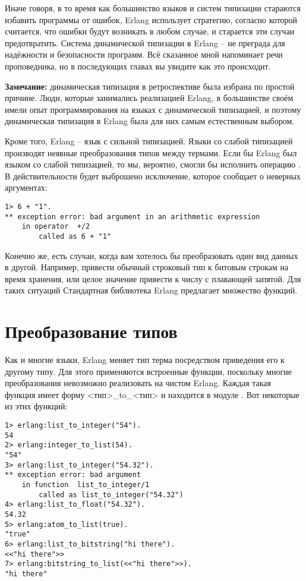 Иначе говоря, в то время как большинство языков и систем типизации стараются избавить программы от ошибок, Erlang использует стратегию, согласно которой считается, что ошибки будут возникать в любом случае, и старается эти случаи предотвратить.
Система динамической типизации в Erlang \--- не преграда для надёжности и безопасности программ.
Всё сказанное мной напоминает речи проповедника, но в последующих главах вы увидите как это происходит.\\
\colorbox{lgray}
{
    \begin{minipage}{\linewidth}
\textbf{Замечание:} динамическая типизация в ретроспективе была избрана по простой причине.
Люди, которые занимались реализацией Erlang, в большинстве своём имели опыт программирования на языках с динамической типизацией, и поэтому динамическая типизация в Erlang была для них самым естественным выбором.
    \end{minipage}
}

Кроме того, Erlang \--- язык с сильной типизацией.
Языки со слабой типизацией производят неявные преобразования типов между термами.
Если бы Erlang был языком со слабой типизацией, то мы, вероятно, смогли бы исполнить операцию .
В действительности будет выброшено исключение, которое сообщает о неверных аргументах:
\begin{lstlisting}[style=erlang]
1> 6 + "1".
** exception error: bad argument in an arithmetic expression
    in operator  +/2
        called as 6 + "1"
\end{lstlisting}

Конечно же, есть случаи, когда вам хотелось бы преобразовать один вид данных в другой.
Например, привести обычный строковый тип к битовым строкам на время хранения, или целое значение привести к числу с плавающей запятой.
Для таких ситуаций Стандартная библиотека Erlang предлагает множество функций.
\section{Преобразование типов}
\label{type-conversions}
Как и многие языки, Erlang меняет тип терма посредством приведения его к другому типу.
Для этого применяются встроенные функции, поскольку многие преобразования невозможно реализовать на чистом Erlang.
Каждая такая функция имеет форму <тип>\_to\_<тип> и находится в модуле .
Вот некоторые из этих функций:
\begin{lstlisting}[style=erlang]
1> erlang:list_to_integer("54").
54
2> erlang:integer_to_list(54).
"54"
3> erlang:list_to_integer("54.32").
** exception error: bad argument
    in function  list_to_integer/1
        called as list_to_integer("54.32")
4> erlang:list_to_float("54.32").
54.32
5> erlang:atom_to_list(true).
"true"
6> erlang:list_to_bitstring("hi there").
<<"hi there">>
7> erlang:bitstring_to_list(<<"hi there">>).
"hi there"
\end{lstlisting}

